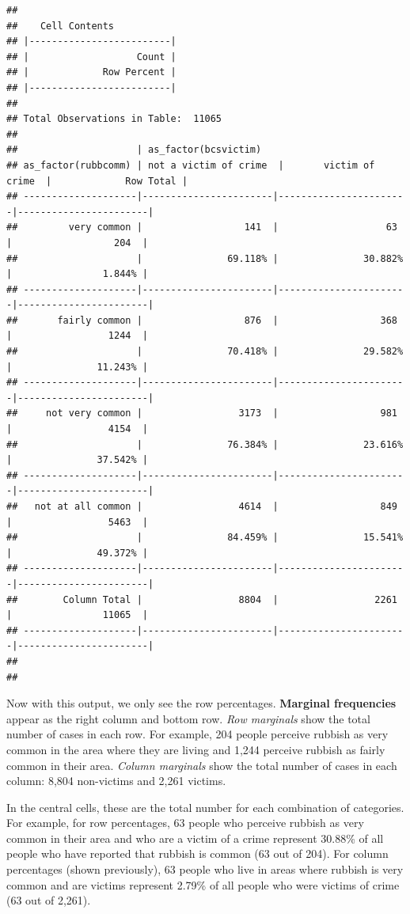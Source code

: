 \documentclass[
]{book}
\begin{document}
\begin{verbatim}
## 
##    Cell Contents
## |-------------------------|
## |                   Count |
## |             Row Percent |
## |-------------------------|
## 
## Total Observations in Table:  11065 
## 
##                     | as_factor(bcsvictim) 
## as_factor(rubbcomm) | not a victim of crime  |       victim of crime  |             Row Total | 
## --------------------|-----------------------|-----------------------|-----------------------|
##         very common |                  141  |                   63  |                  204  | 
##                     |               69.118% |               30.882% |                1.844% | 
## --------------------|-----------------------|-----------------------|-----------------------|
##       fairly common |                  876  |                  368  |                 1244  | 
##                     |               70.418% |               29.582% |               11.243% | 
## --------------------|-----------------------|-----------------------|-----------------------|
##     not very common |                 3173  |                  981  |                 4154  | 
##                     |               76.384% |               23.616% |               37.542% | 
## --------------------|-----------------------|-----------------------|-----------------------|
##   not at all common |                 4614  |                  849  |                 5463  | 
##                     |               84.459% |               15.541% |               49.372% | 
## --------------------|-----------------------|-----------------------|-----------------------|
##        Column Total |                 8804  |                 2261  |                11065  | 
## --------------------|-----------------------|-----------------------|-----------------------|
## 
## 
\end{verbatim}

Now with this output, we only see the row percentages. \textbf{Marginal frequencies} appear as the right column and bottom row. \emph{Row marginals} show the total number of cases in each row. For example, 204 people perceive rubbish as very common in the area where they are living and 1,244 perceive rubbish as fairly common in their area. \emph{Column marginals} show the total number of cases in each column: 8,804 non-victims and 2,261 victims.

In the central cells, these are the total number for each combination of categories. For example, for row percentages, 63 people who perceive rubbish as very common in their area and who are a victim of a crime represent 30.88\% of all people who have reported that rubbish is common (63 out of 204). For column percentages (shown previously), 63 people who live in areas where rubbish is very common and are victims represent 2.79\% of all people who were victims of crime (63 out of 2,261).
\end{document}
